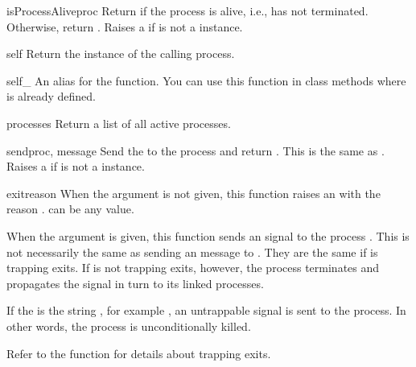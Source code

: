 \documentclass{howto}
\begin{document}
\begin{funcdesc}{isProcessAlive}{proc}
Return  if the process is alive, i.e., has not terminated.
Otherwise, return . Raises a 
 if  is not a  instance.
\end{funcdesc}

\begin{funcdesc}{self}{}
Return the  instance of the calling process.
\end{funcdesc}

\begin{funcdesc}{self_}{}
An alias for the  function. You can use this function in class
methods where  is already defined.
\end{funcdesc}

\begin{funcdesc}{processes}{}
Return a list of all active processes.
\end{funcdesc}

\begin{funcdesc}{send}{proc, message}
Send the  to the  process and return . This
is the same as \code{)}. Raises a
  if  is not a 
instance.
\end{funcdesc}

\begin{funcdesc}{exit}{reason}
When the  argument is not given, this function raises an
 with the reason .  can be any
value.

When the  argument is given, this function sends an 
signal to the process . This is not necessarily the same as sending an
 message to . They are the same if  is trapping
exits. If  is not trapping exits, however, the  process
terminates and propagates the  signal in turn to its linked
processes.

If the  is the string , for example
, an untrappable  signal is sent to the
process. In other words, the  process is unconditionally killed.

Refer to the  function for details about trapping exits.
\end{funcdesc}
\end{document}
